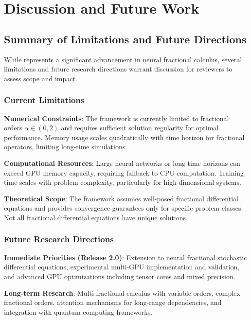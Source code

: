 \section{Discussion and Future Work}

\subsection{Summary of Limitations and Future Directions}

While \hpfracc represents a significant advancement in neural fractional calculus, several limitations and future research directions warrant discussion for reviewers to assess scope and impact.

\subsubsection{Current Limitations}

\textbf{Numerical Constraints}: The framework is currently limited to fractional orders $\alpha \in (0, 2)$ and requires sufficient solution regularity for optimal performance. Memory usage scales quadratically with time horizon for fractional operators, limiting long-time simulations.

\textbf{Computational Resources}: Large neural networks or long time horizons can exceed GPU memory capacity, requiring fallback to CPU computation. Training time scales with problem complexity, particularly for high-dimensional systems.

\textbf{Theoretical Scope}: The framework assumes well-posed fractional differential equations and provides convergence guarantees only for specific problem classes. Not all fractional differential equations have unique solutions.

\subsubsection{Future Research Directions}

\textbf{Immediate Priorities (Release 2.0)}: Extension to neural fractional stochastic differential equations, experimental multi-GPU implementation and validation, and advanced GPU optimizations including tensor cores and mixed precision.

\textbf{Long-term Research}: Multi-fractional calculus with variable orders, complex fractional orders, attention mechanisms for long-range dependencies, and integration with quantum computing frameworks.

